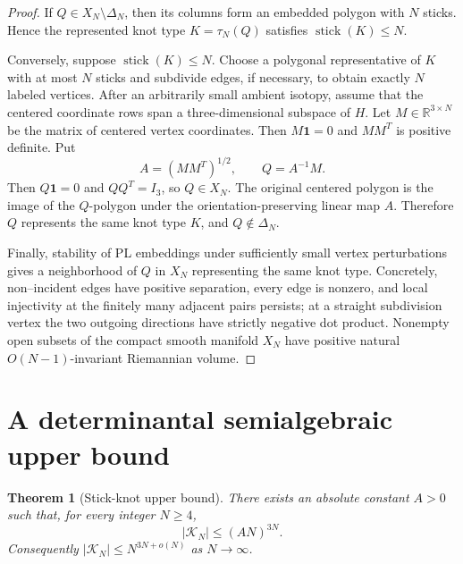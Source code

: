 \documentclass[11pt]{article}
\newtheorem{theorem}{Theorem}
\theoremstyle{remark}
\theoremstyle{plain}
\newcommand{\R}{\mathbb{R}}
\newcommand{\Kcal}{\mathcal{K}}
\begin{document}
\begin{proof}
If \(Q\in X_N\setminus\Delta_N\), then its columns form an embedded polygon
with \(N\) sticks.  Hence the represented knot type \(K=\tau_N(Q)\) satisfies
\(\operatorname{stick}(K)\le N\).

Conversely, suppose \(\operatorname{stick}(K)\le N\).  Choose a polygonal
representative of \(K\) with at most \(N\) sticks and subdivide edges, if
necessary, to obtain exactly \(N\) labeled vertices.  After an arbitrarily small
ambient isotopy, assume that the centered coordinate rows span a
three-dimensional subspace of \(H\).  Let \(M\in\R^{3\times N}\) be the matrix
of centered vertex coordinates.  Then \(M\mathbf 1=0\) and \(MM^T\) is positive
definite.  Put
\[
    A=(MM^T)^{1/2},\qquad Q=A^{-1}M.
\]
Then \(Q\mathbf 1=0\) and \(QQ^T=I_3\), so \(Q\in X_N\).  The original centered
polygon is the image of the \(Q\)-polygon under the orientation-preserving
linear map \(A\).  Therefore \(Q\) represents the same knot type \(K\), and
\(Q\notin\Delta_N\).

Finally, stability of PL embeddings under sufficiently small vertex
perturbations \cite{EdwardsKirby} gives a neighborhood of \(Q\) in \(X_N\)
representing the same knot type.  Concretely, non--incident edges have
positive separation, every edge is nonzero, and local injectivity at the
finitely many adjacent pairs persists; at a straight subdivision vertex the
two outgoing directions have strictly negative dot product.  Nonempty open
subsets of the compact smooth manifold \(X_N\) have positive natural
\(O(N-1)\)-invariant Riemannian volume.
\end{proof}

\section{A determinantal semialgebraic upper bound}

\begin{theorem}[Stick-knot upper bound]\label{thm:upper}
There exists an absolute constant \(A>0\) such that, for every integer
\(N\ge4\),
\[
    |\Kcal_N|\le (A N)^{3N}.
\]
Consequently \(|\Kcal_N|\le N^{3N+o(N)}\) as \(N\to\infty\).
\end{theorem}
\end{document}

